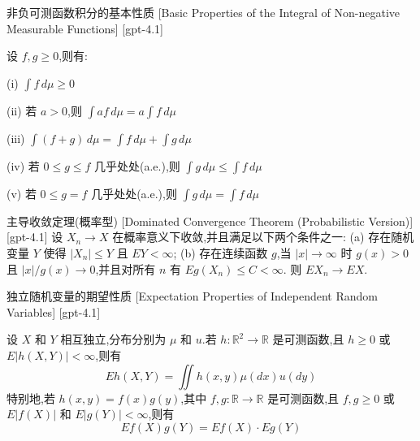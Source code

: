 \documentclass[UTF8]{ctexart}
\begin{document}
    \begin{lma}
        {非负可测函数积分的基本性质}
        [Basic Properties of the Integral of Non-negative Measurable Functions]
        [gpt-4.1]
        
设 $f, g \ge 0$,则有:

(i) $\int f \, d\mu \geq 0$ 

(ii) 若 $a > 0$,则 $\int a f \, d\mu = a \int f \, d\mu$

(iii) $\int (f + g) \, d\mu = \int f \, d\mu + \int g \, d\mu$

(iv) 若 $0 \leq g \leq f$ 几乎处处(a.e.),则 $\int g \, d\mu \leq \int f \, d\mu$

(v) 若 $0 \leq g = f$ 几乎处处(a.e.),则 $\int g \, d\mu = \int f \, d\mu$

    \end{lma}
    
    
    
    \begin{thm}
        {主导收敛定理(概率型)}
        [Dominated Convergence Theorem (Probabilistic Version)]
        [gpt-4.1]
        设 $X_n \to X$ 在概率意义下收敛,并且满足以下两个条件之一:
(a) 存在随机变量 $Y$ 使得 $|X_n| \leq Y$ 且 $E Y < \infty$;
(b) 存在连续函数 $g$,当 $|x| \to \infty$ 时 $g(x) > 0$ 且 $|x| / g(x) \to 0$,并且对所有 $n$ 有 $E g(X_n) \leq C < \infty$.
则 $E X_n \to E X$.

    \end{thm}
    
    
    
    \begin{thm}
        {独立随机变量的期望性质}
        [Expectation Properties of Independent Random Variables]
        [gpt-4.1]
        
设 $X$ 和 $Y$ 相互独立,分布分别为 $\mu$ 和 $
u$.若 $h : \mathbb{R}^{2} \to \mathbb{R}$ 是可测函数,且 $h \geq 0$ 或 $E|h(X, Y)| < \infty$,则有
\[
E h(X, Y) = \iint h(x, y) \mu(dx) 
u(dy)
\]
特别地,若 $h(x, y) = f(x)g(y)$,其中 $f, g : \mathbb{R} \to \mathbb{R}$ 是可测函数,且 $f, g \ge 0$ 或 $E|f(X)|$ 和 $E|g(Y)| < \infty$,则有
\[
E f(X) g(Y) = E f(X) \cdot E g(Y)
\]

    \end{thm}
    
    
    
\end{document}
